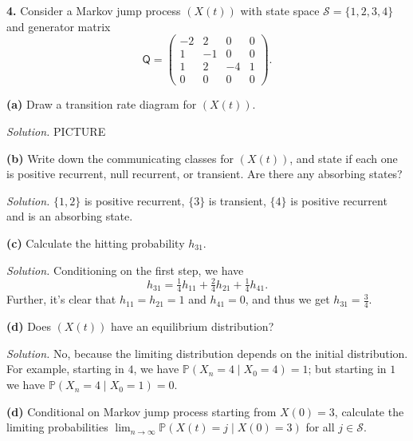 \documentclass[
  a4paper,
]{article}
\theoremstyle{definition}
\theoremstyle{definition}
\theoremstyle{definition}
\theoremstyle{remark}
\begin{document}
\textbf{4.} Consider a Markov jump process \((X(t))\) with state space \(\mathcal S = \{1,2,3,4\}\) and generator matrix
\[ \mathsf Q = \begin{pmatrix} -2 & 2 & 0 & 0 \\ 1 & -1 & 0 & 0 \\ 1 & 2 & -4 & 1 \\ 0 & 0 & 0 & 0 \end{pmatrix}.   \]

\textbf{(a)} Draw a transition rate diagram for \((X(t))\).

\begin{myanswers}
\emph{Solution.}
PICTURE

\end{myanswers}

\textbf{(b)} Write down the communicating classes for \((X(t))\), and state if each one is positive recurrent, null recurrent, or transient. Are there any absorbing states?

\begin{myanswers}
\emph{Solution.}
\(\{1,2\}\) is positive recurrent, \(\{3\}\) is transient, \(\{4\}\) is positive recurrent and is an absorbing state.

\end{myanswers}

\textbf{(c)} Calculate the hitting probability \(h_{31}\).

\begin{myanswers}
\emph{Solution.}
Conditioning on the first step, we have
\[ h_{31} = \tfrac14 h_{11} + \tfrac24 h_{21} + \tfrac14 h_{41} .   \]
Further, it's clear that \(h_{11} = h_{21} = 1\) and \(h_{41} = 0\), and thus we get \(h_{31} = \frac34\).

\end{myanswers}

\textbf{(d)} Does \((X(t))\) have an equilibrium distribution?

\begin{myanswers}
\emph{Solution.}
No, because the limiting distribution depends on the initial distribution. For example, starting in \(4\), we have \(\mathbb P(X_n = 4 \mid X_0 = 4) = 1\); but starting in \(1\) we have \(\mathbb P(X_n = 4 \mid X_0 = 1) = 0\).

\end{myanswers}

\textbf{(d)} Conditional on Markov jump process starting from \(X(0) = 3\), calculate the limiting probabilities \(\lim_{n \to \infty} \mathbb P(X(t) = j \mid X(0) = 3)\) for all \(j \in \mathcal S\).
\end{document}
